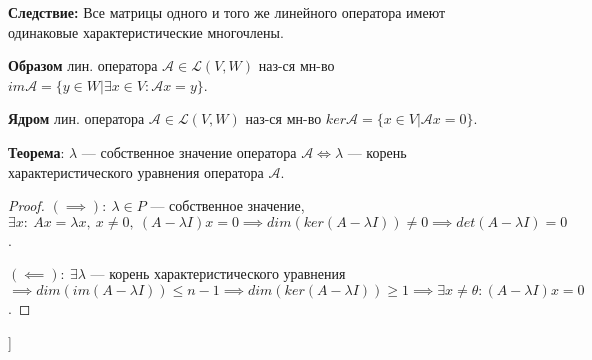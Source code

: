 \textbf{Следствие:} Все матрицы одного и того же линейного оператора имеют одинаковые характеристические многочлены.

\bigbreak

\textbf{Образом} лин. оператора $\mathcal{A} \in \mathcal{L}(V, W)$ наз-ся мн-во $im\mathcal{A} = \{y \in W | \exists x \in V : \mathcal{A}x=y \}$.

\textbf{Ядром} лин. оператора $\mathcal{A} \in \mathcal{L}(V, W)$ наз-ся мн-во $ker\mathcal{A} = \{x \in V | \mathcal{A}x=0 \}$.

\textbf{Теорема}: $\lambda$ --- собственное значение оператора $\mathcal{A} \iff \lambda$ --- корень характеристического уравнения оператора $\mathcal{A}$.

\begin{proof}
 $(\implies):~\lambda \in P$ --- собственное значение, $\exists x:~Ax = \lambda x,~x\neq 0,~(A - \lambda I)x = 0 \implies
    dim(ker(A - \lambda I))\neq 0 \implies det(A - \lambda I) = 0$.

    $(\impliedby):~\exists\lambda$ --- корень характеристического уравнения $\implies dim(im(A - \lambda I))
    \leqslant n - 1 \implies dim(ker(A - \lambda I)) \geqslant 1 \implies \exists x\neq\theta : (A - \lambda I)x = 0$.
\end{proof}



\bigbreak
[\cite[page 240-260]{kim}]